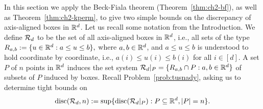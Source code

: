 In this section we apply the Beck-Fiala theorem (Theorem~\ref{thm:ch2-bf}), as well as Theorem~\ref{thm:ch2-kperm}, to give two simple bounds on the
discrepancy of axis-aligned boxes in \(\mathbb{R}^d\). Let us recall some
notation from the Introduction. We define \(\mathcal{R}_d\) to be the set of
all axis-aligned boxes in \(\mathbb{R}^d\), i.e., all sets of the type
\( R_{a,b} := \{u \in \mathbb{R}^d: a \le u \le b\}, \) where
\(a,b\in \mathbb{R}^d\), and \(a \le u \le b\) is understood to hold
coordinate by coordinate, i.e., \(a(i) \le u(i) \le b(i)\) for all
\(i \in [d]\). A set \(P\) of \(n\) points in \(\mathbb{R}^d\) induces the set
system \(\mathcal{R}_d|_P = \{R_{a,b} \cap P: a,b \in \mathbb{R}^d\}\) of subsets
of \(P\) induced by boxes. Recall Problem~\ref{prob:tusnady}, asking
us to determine tight bounds on 
  \[
    \operatorname{disc}(\mathcal{R}_d, n) := \sup\{\operatorname{disc}(\mathcal{R}_d|_P): P \subseteq \mathbb{R}^d, |P| = n\}.
  \]

